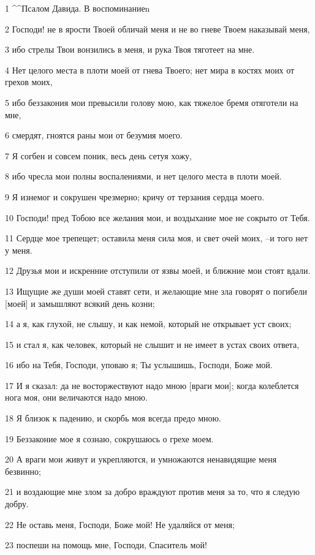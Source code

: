 \par 1 ^^Псалом Давида. В воспоминание^^.
\par 2 Господи! не в ярости Твоей обличай меня и не во гневе Твоем наказывай меня,
\par 3 ибо стрелы Твои вонзились в меня, и рука Твоя тяготеет на мне.
\par 4 Нет целого места в плоти моей от гнева Твоего; нет мира в костях моих от грехов моих,
\par 5 ибо беззакония мои превысили голову мою, как тяжелое бремя отяготели на мне,
\par 6 смердят, гноятся раны мои от безумия моего.
\par 7 Я согбен и совсем поник, весь день сетуя хожу,
\par 8 ибо чресла мои полны воспалениями, и нет целого места в плоти моей.
\par 9 Я изнемог и сокрушен чрезмерно; кричу от терзания сердца моего.
\par 10 Господи! пред Тобою все желания мои, и воздыхание мое не сокрыто от Тебя.
\par 11 Сердце мое трепещет; оставила меня сила моя, и свет очей моих, --и того нет у меня.
\par 12 Друзья мои и искренние отступили от язвы моей, и ближние мои стоят вдали.
\par 13 Ищущие же души моей ставят сети, и желающие мне зла говорят о погибели [моей] и замышляют всякий день козни;
\par 14 а я, как глухой, не слышу, и как немой, который не открывает уст своих;
\par 15 и стал я, как человек, который не слышит и не имеет в устах своих ответа,
\par 16 ибо на Тебя, Господи, уповаю я; Ты услышишь, Господи, Боже мой.
\par 17 И я сказал: да не восторжествуют надо мною [враги мои]; когда колеблется нога моя, они величаются надо мною.
\par 18 Я близок к падению, и скорбь моя всегда предо мною.
\par 19 Беззаконие мое я сознаю, сокрушаюсь о грехе моем.
\par 20 А враги мои живут и укрепляются, и умножаются ненавидящие меня безвинно;
\par 21 и воздающие мне злом за добро враждуют против меня за то, что я следую добру.
\par 22 Не оставь меня, Господи, Боже мой! Не удаляйся от меня;
\par 23 поспеши на помощь мне, Господи, Спаситель мой!

